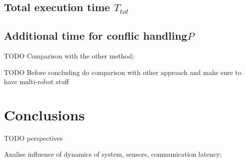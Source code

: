 \documentclass[eprint]{actapoly}
\begin{document}
\subsection{Total execution time $T_{tot}$}



\subsection{Additional time for conflic handling$P$}


TODO Comparison with the other method;

TODO Before concluding do comparison with other approach and make sure to have multi-robot stuff

\section{Conclusions}





TODO perspectives

Analise influence of dynamics of system, sensors, communication latency;



\end{document}
